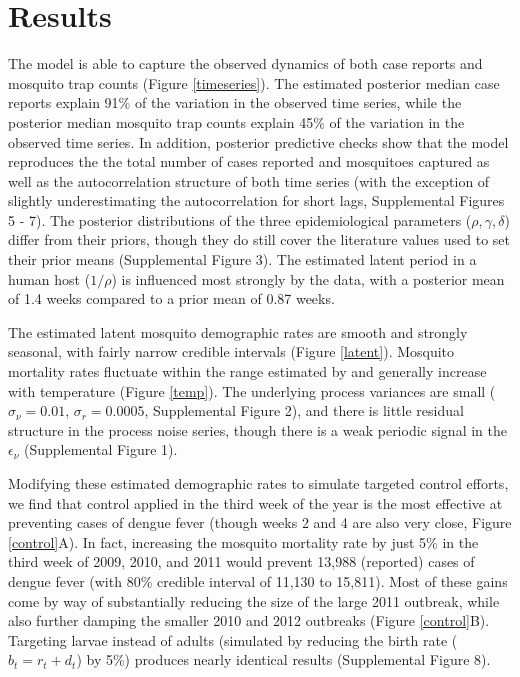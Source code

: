 \documentclass[10pt,letterpaper]{article}
\begin{document}
\section*{Results}

The model is able to capture the observed dynamics of both case reports and mosquito trap counts (Figure \ref{timeseries}).
The estimated posterior median case reports explain 91\% of the variation in the observed time series, while the posterior median mosquito trap counts explain 45\% of the variation in the observed time series. 
In addition, posterior predictive checks show that the model reproduces the the total number of cases reported and mosquitoes captured as well as the autocorrelation structure of both time series (with the exception of slightly underestimating the autocorrelation for short lags, Supplemental Figures 5 - 7).
The posterior distributions of the three epidemiological parameters ($\rho, \gamma, \delta$) differ from their priors, though they do still cover the literature values used to set their prior means (Supplemental Figure 3).
The estimated latent period in a human host ($1/\rho$) is influenced most strongly by the data, with a posterior mean of 1.4 weeks compared to a prior mean of 0.87 weeks.

The estimated latent mosquito demographic rates are smooth and strongly seasonal, with fairly narrow credible intervals (Figure \ref{latent}).
Mosquito mortality rates fluctuate within the range estimated by \cite{Brady2013} and generally increase with temperature (Figure \ref{temp}).
The underlying process variances are small ($\sigma_{\nu} = 0.01$, $\sigma_r = 0.0005$, Supplemental Figure 2), and there is little residual structure in the process noise series, though there is a weak periodic signal in the $\epsilon_{\nu}$ (Supplemental Figure 1).

Modifying these estimated demographic rates to simulate targeted control efforts, we find that control applied in the third week of the year is the most effective at preventing cases of dengue fever (though weeks 2 and 4 are also very close, Figure \ref{control}A).
In fact, increasing the mosquito mortality rate by just 5\% in the third week of 2009, 2010, and 2011 would prevent 13,988 (reported) cases of dengue fever (with 80\% credible interval of 11,130 to 15,811).
Most of these gains come by way of substantially reducing the size of the large 2011 outbreak, while also further damping the smaller 2010 and 2012 outbreaks (Figure \ref{control}B).
Targeting larvae instead of adults (simulated by reducing the birth rate ($b_t = r_t + d_t$) by 5\%) produces nearly identical results (Supplemental Figure 8).
\end{document}

